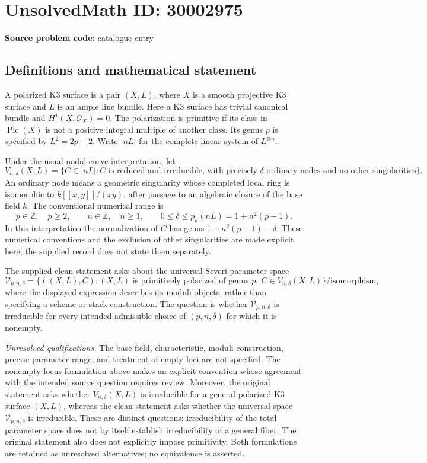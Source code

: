 \documentclass[11pt]{article}
\newcommand{\Z}{\mathbb{Z}}
\begin{document}
\section*{UnsolvedMath ID: 30002975}
\textbf{Source problem code:} catalogue entry
\subsection{Definitions and mathematical statement}
A polarized K3 surface is a pair \((X,L)\), where \(X\) is a smooth projective K3 surface and \(L\) is an ample line bundle. Here a K3 surface has trivial canonical bundle and \(H^1(X,\mathcal O_X)=0\). The polarization is primitive if its class in \(\operatorname{Pic}(X)\) is not a positive integral multiple of another class. Its genus \(p\) is specified by \(L^2=2p-2\). Write \(|nL|\) for the complete linear system of \(L^{\otimes n}\).

Under the usual nodal-curve interpretation, let
\[
V_{n,\delta}(X,L)=\{C\in |nL|: C\text{ is reduced and irreducible, with precisely }\delta\text{ ordinary nodes and no other singularities}\}.
\]
An ordinary node means a geometric singularity whose completed local ring is isomorphic to \(\overline{k}[[x,y]]/(xy)\), after passage to an algebraic closure of the base field \(k\). The conventional numerical range is
\[
p\in\Z,\quad p\geq2,\qquad n\in\Z,\quad n\geq1,\qquad 0\leq\delta\leq p_a(nL)=1+n^2(p-1).
\]
In this interpretation the normalization of \(C\) has genus \(1+n^2(p-1)-\delta\). These numerical conventions and the exclusion of other singularities are made explicit here; the supplied record does not state them separately.

The supplied clean statement asks about the universal Severi parameter space
\[
\mathcal V_{p,n,\delta}=\{((X,L),C):(X,L)\text{ is primitively polarized of genus }p,\ C\in V_{n,\delta}(X,L)\}/\text{isomorphism},
\]
where the displayed expression describes its moduli objects, rather than specifying a scheme or stack construction. The question is whether \(\mathcal V_{p,n,\delta}\) is irreducible for every intended admissible choice of \((p,n,\delta)\) for which it is nonempty.

\emph{Unresolved qualifications.} The base field, characteristic, moduli construction, precise parameter range, and treatment of empty loci are not specified. The nonempty-locus formulation above makes an explicit convention whose agreement with the intended source question requires review. Moreover, the original statement asks whether \(V_{n,\delta}(X,L)\) is irreducible for a general polarized K3 surface \((X,L)\), whereas the clean statement asks whether the universal space \(\mathcal V_{p,n,\delta}\) is irreducible. These are distinct questions: irreducibility of the total parameter space does not by itself establish irreducibility of a general fiber. The original statement also does not explicitly impose primitivity. Both formulations are retained as unresolved alternatives; no equivalence is asserted.
\end{document}
